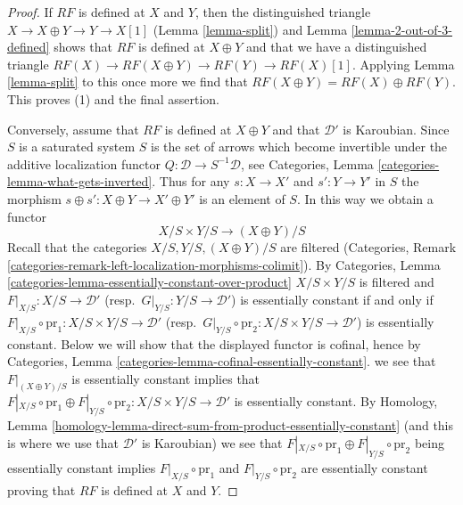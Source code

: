 \begin{proof}
If $RF$ is defined at $X$ and $Y$, then the distinguished triangle
$X \to X \oplus Y \to Y \to X[1]$ (Lemma \ref{lemma-split}) and
Lemma \ref{lemma-2-out-of-3-defined}
shows that $RF$ is defined at $X \oplus Y$ and that we
have a distinguished triangle
$RF(X) \to RF(X \oplus Y) \to RF(Y) \to RF(X)[1]$.
Applying Lemma \ref{lemma-split} to this once more we find
that $RF(X \oplus Y) = RF(X) \oplus RF(Y)$.
This proves (1) and the final assertion.

\medskip\noindent
Conversely, assume that $RF$ is defined at $X \oplus Y$ and that $\mathcal{D}'$
is Karoubian. Since $S$ is a saturated system $S$ is the set of arrows which
become invertible under the additive localization functor
$Q : \mathcal{D} \to S^{-1}\mathcal{D}$, see
Categories, Lemma \ref{categories-lemma-what-gets-inverted}.
Thus for any $s : X \to X'$ and $s' : Y \to Y'$ in $S$ the morphism
$s \oplus s' : X \oplus Y \to X' \oplus Y'$ is an element of $S$.
In this way we obtain a functor
$$
X/S \times Y/S \longrightarrow (X \oplus Y)/S
$$
Recall that the categories $X/S, Y/S, (X \oplus Y)/S$ are filtered
(Categories, Remark
\ref{categories-remark-left-localization-morphisms-colimit}).
By Categories, Lemma \ref{categories-lemma-essentially-constant-over-product}
$X/S \times Y/S$ is filtered and
$F|_{X/S} : X/S \to \mathcal{D}'$ (resp.\ $G|_{Y/S} : Y/S \to \mathcal{D}'$)
is essentially constant if and only if
$F|_{X/S} \circ \text{pr}_1 : X/S \times Y/S \to \mathcal{D}'$
(resp.\ $G|_{Y/S} \circ \text{pr}_2 : X/S \times Y/S \to \mathcal{D}'$)
is essentially constant. Below we will show that the displayed functor
is cofinal, hence by
Categories, Lemma \ref{categories-lemma-cofinal-essentially-constant}.
we see that $F|_{(X \oplus Y)/S}$ is essentially constant implies that
$F|_{X/S} \circ \text{pr}_1 \oplus F|_{Y/S} \circ \text{pr}_2 :
X/S \times Y/S \to \mathcal{D}'$
is essentially constant. By Homology, Lemma
\ref{homology-lemma-direct-sum-from-product-essentially-constant}
(and this is where we use that $\mathcal{D}'$ is Karoubian)
we see that 
$F|_{X/S} \circ \text{pr}_1 \oplus F|_{Y/S} \circ \text{pr}_2$
being essentially constant implies
$F|_{X/S} \circ \text{pr}_1$ and
$F|_{Y/S} \circ \text{pr}_2$ are essentially constant proving that $RF$ is
defined at $X$ and $Y$.


\end{proof}
